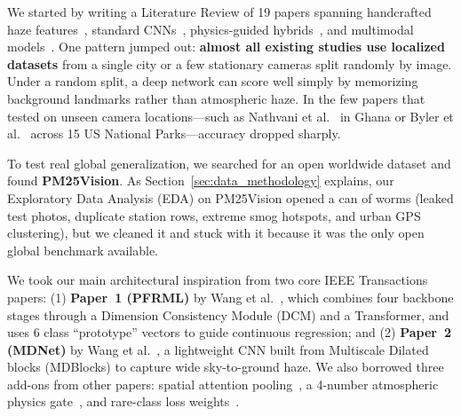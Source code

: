 \documentclass[conference]{IEEEtran}
\begin{document}
We started by writing a Literature Review of 19 papers spanning handcrafted haze
features~\cite{marzaguiReviewImageQuality2024, chakrabortyCanImageTell2024,
yadavRoadsideTreeImageBased2025}, standard
CNNs~\cite{kaushalEvaluationDeepLearning2024, vermaImagebasedAirPollution2025,
kumaar.bImageBasedAir2025, zhangAirQualityLevel2024}, physics-guided
hybrids~\cite{dohaDeepMultiTaskLearning2026, razimiIntegratingDeepLearning2024a,
leeEnhancingPM25Detection2025}, and multimodal
models~\cite{abdelsalamSkyFuseNetCrossAttentionSwin2026,
kambleMobileImageDrivenPM252025, hanSmartCamAirDetectContrastiveApproach2025,
mohanDeepLearningBasedPM252025, vahdatpourForecastingVisualizingAir2025}. One
pattern jumped out: \textbf{almost all existing studies use localized datasets}
from a single city or a few stationary cameras split randomly by image. Under a
random split, a deep network can score well simply by memorizing background
landmarks rather than atmospheric haze. In the few papers that tested on unseen
camera locations---such as Nathvani et al.~\cite{nathvaniHereNowEvaluating2023}
in Ghana or Byler et al.~\cite{bylerLocationGeneralizabilityImageBased2025}
across 15 US National Parks---accuracy dropped sharply.

To test real global generalization, we searched for an open worldwide dataset
and found \textbf{PM25Vision}. As Section~\ref{sec:data_methodology} explains,
our Exploratory Data Analysis (EDA) on PM25Vision opened a can of worms (leaked
test photos, duplicate station rows, extreme smog hotspots, and urban GPS
clustering), but we cleaned it and stuck with it because it was the only open
global benchmark available.

We took our main architectural inspiration from two core IEEE Transactions
papers: (1) \textbf{Paper~1 (PFRML)} by Wang et
al.~\cite{wangPrototypeFeatureRepresentationGuided2026}, which combines four
backbone stages through a Dimension Consistency Module (DCM) and a Transformer,
and uses 6 class ``prototype'' vectors to guide continuous regression; and (2)
\textbf{Paper~2 (MDNet)} by Wang et al.~\cite{wangLightweightAirQuality2024}, a
lightweight CNN built from Multiscale Dilated blocks (MDBlocks) to capture wide
sky-to-ground haze. We also borrowed three add-ons from other papers: spatial
attention pooling~\cite{abdelsalamSkyFuseNetCrossAttentionSwin2026,
leeEnhancingPM25Detection2025}, a 4-number atmospheric physics
gate~\cite{dohaDeepMultiTaskLearning2026, yadavRoadsideTreeImageBased2025}, and
rare-class loss weights~\cite{dohaDeepMultiTaskLearning2026,
bylerLocationGeneralizabilityImageBased2025}.
\end{document}
